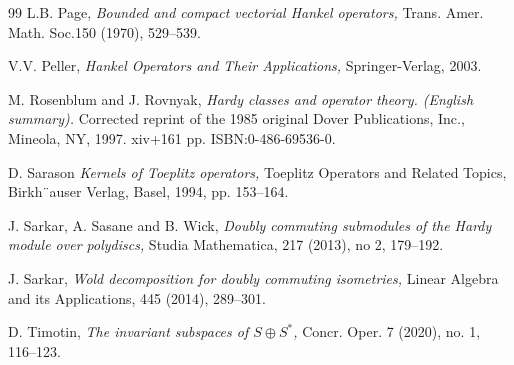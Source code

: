 \documentclass[12pt]{amsart}
\theoremstyle{definition}
\newcommand{\1}{{\mbox{\bf 1}}}
\begin{document}
\begin{thebibliography}{99}
L.B. Page, 
\emph{Bounded and compact vectorial Hankel operators,} Trans. Amer. Math. Soc.150 (1970), 529--539.

V.V. Peller, 
\emph{Hankel Operators and Their Applications,} Springer-Verlag, 2003.

M. Rosenblum and J. Rovnyak, 
\emph{Hardy classes and operator theory. (English summary).} Corrected reprint of the 1985 original Dover Publications, Inc., Mineola, NY, 1997. xiv+161 pp. ISBN:0-486-69536-0.

D. Sarason
\emph{Kernels of Toeplitz operators,} Toeplitz Operators and Related Topics, Birkh¨auser
Verlag, Basel, 1994, pp. 153--164.

J. Sarkar, A. Sasane and B. Wick, 
\emph{Doubly commuting submodules of the Hardy module over polydiscs,} Studia Mathematica, 217 (2013), no 2, 179--192.

J. Sarkar,
\emph{Wold decomposition for doubly commuting isometries,} Linear Algebra and its Applications, 445 (2014), 289--301. 

D. Timotin, 
\emph{ The invariant subspaces of $S \oplus S^*$,} Concr. Oper. 7 (2020), no. 1, 116--123. 

\end{thebibliography}
\end{document}

